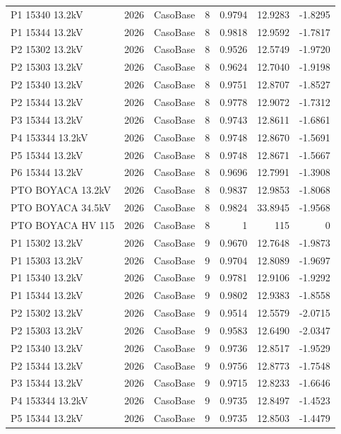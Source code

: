 \documentclass[11pt,a4paper]{article}
\begin{document}
\begin{longtable}{llllrrr}
P1 15340 13.2kV & 2026 & CasoBase & 8 & 0.9794 & 12.9283 & -1.8295 \\
P1 15344 13.2kV & 2026 & CasoBase & 8 & 0.9818 & 12.9592 & -1.7817 \\
P2 15302 13.2kV & 2026 & CasoBase & 8 & 0.9526 & 12.5749 & -1.9720 \\
P2 15303 13.2kV & 2026 & CasoBase & 8 & 0.9624 & 12.7040 & -1.9198 \\
P2 15340 13.2kV & 2026 & CasoBase & 8 & 0.9751 & 12.8707 & -1.8527 \\
P2 15344 13.2kV & 2026 & CasoBase & 8 & 0.9778 & 12.9072 & -1.7312 \\
P3 15344 13.2kV & 2026 & CasoBase & 8 & 0.9743 & 12.8611 & -1.6861 \\
P4 153344 13.2kV & 2026 & CasoBase & 8 & 0.9748 & 12.8670 & -1.5691 \\
P5 15344 13.2kV & 2026 & CasoBase & 8 & 0.9748 & 12.8671 & -1.5667 \\
P6 15344 13.2kV & 2026 & CasoBase & 8 & 0.9696 & 12.7991 & -1.3908 \\
PTO BOYACA 13.2kV & 2026 & CasoBase & 8 & 0.9837 & 12.9853 & -1.8068 \\
PTO BOYACA 34.5kV & 2026 & CasoBase & 8 & 0.9824 & 33.8945 & -1.9568 \\
PTO BOYACA HV 115 & 2026 & CasoBase & 8 & 1 & 115 & 0 \\
P1 15302 13.2kV & 2026 & CasoBase & 9 & 0.9670 & 12.7648 & -1.9873 \\
P1 15303 13.2kV & 2026 & CasoBase & 9 & 0.9704 & 12.8089 & -1.9697 \\
P1 15340 13.2kV & 2026 & CasoBase & 9 & 0.9781 & 12.9106 & -1.9292 \\
P1 15344 13.2kV & 2026 & CasoBase & 9 & 0.9802 & 12.9383 & -1.8558 \\
P2 15302 13.2kV & 2026 & CasoBase & 9 & 0.9514 & 12.5579 & -2.0715 \\
P2 15303 13.2kV & 2026 & CasoBase & 9 & 0.9583 & 12.6490 & -2.0347 \\
P2 15340 13.2kV & 2026 & CasoBase & 9 & 0.9736 & 12.8517 & -1.9529 \\
P2 15344 13.2kV & 2026 & CasoBase & 9 & 0.9756 & 12.8773 & -1.7548 \\
P3 15344 13.2kV & 2026 & CasoBase & 9 & 0.9715 & 12.8233 & -1.6646 \\
P4 153344 13.2kV & 2026 & CasoBase & 9 & 0.9735 & 12.8497 & -1.4523 \\
P5 15344 13.2kV & 2026 & CasoBase & 9 & 0.9735 & 12.8503 & -1.4479 \\

\end{longtable}
\end{document}
